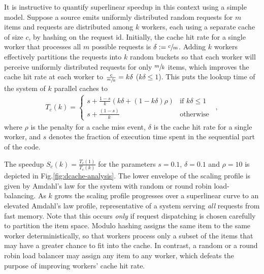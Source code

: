 It is instructive to quantify superlinear speedup in this context using a simple model. Suppose a source emits uniformly distributed random requests for $m$ items and requests are distributed among $k$ workers, each using a separate cache of size $c$, by hashing on the request id.  Initially, the cache hit rate for a single worker that processes all $m$ possible requests is $\delta := \sfrac{c}{m}$. Adding $k$ workers effectively partitions the requests into $k$ random buckets so that each worker will perceive uniformly distributed requests for only $\sfrac{m}{k}$ items, which improves the cache hit rate at each worker to $\frac{c}{\sfrac{m}{k}} = k\delta$ ($k\delta \le 1$). This puts the lookup time of the system of $k$ parallel caches to
\begin{align}\label{eq:dist-cache}
  T_c(k) = \begin{cases} s + \frac{1-s}{k}(k\delta + (1-k\delta)\rho) & \text{if } k\delta \le 1\\s + \frac{(1-s)}{k} & \text{otherwise}\end{cases} \enspace ,
\end{align}
where $\rho$ is the penalty for a cache miss event, $\delta$ is the cache hit rate for a single worker, and $s$ denotes the fraction of execution time spent in the sequential part of the code.


The speedup $S_c(k)=\frac{T_c(1)}{T_c(k)}$ for the parameters $s=0.1$, $\delta=0.1$ and $\rho=10$ is depicted in Fig.\ref{fig:dcache-analysis}. The lower envelope of the scaling profile is given by Amdahl's law for the system with random or round robin load-balancing. %
As $k$ grows the scaling profile progresses over a superlinear curve to an elevated Amdahl's law profile, representative of a system serving \emph{all} requests from fast memory. %
Note that this occurs \emph{only} if request dispatching is chosen carefully to partition the item space. Modulo hashing assigns the same item to the same worker deterministically, so that workers process only a subset of the items that may have a greater chance to fit into the cache. In contrast, a random or a round robin load balancer may assign any item to any worker, which defeats the purpose of improving workers' cache hit rate. %

